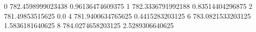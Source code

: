 0 782.4598999023438 0.96136474609375
1 782.3336791992188 0.83514404296875
2 781.49853515625 0.0
4 781.9400634765625 0.4415283203125
6 783.0821533203125 1.5836181640625
8 784.0274658203125 2.5289306640625
